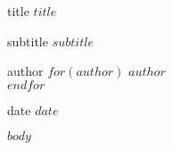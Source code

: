 \documentclass[12pt]{article}
\begin{document}
%
\begin{staticcontents*}{title}
\titlespecs
$title$
\end{staticcontents*}

\begin{staticcontents*}{subtitle}
\subtitlespecs
$subtitle$
\end{staticcontents*}

\begin{staticcontents*}{author}
\authorspecs
$for(author)$
$author$\\
$endfor$
\end{staticcontents*}

\begin{staticcontents*}{date}
 \datespecs
 $date$
\end{staticcontents*} %

$body$
\end{document}
